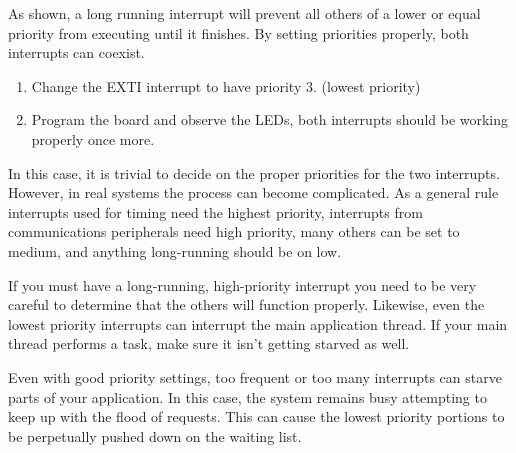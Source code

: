 \documentclass[11pt,fleqn]{book} %
\begin{document}
\begin{exercise}
    As shown, a long running interrupt will prevent all others of a lower or equal priority from executing until it finishes. By setting priorities properly, both interrupts can coexist. 
    
    \begin{enumerate}
        \item Change the EXTI interrupt to have priority 3. (lowest priority)
        \item Program the board and observe the LEDs, both interrupts should be working properly once more.
    \end{enumerate}
    
    In this case, it is trivial to decide on the proper priorities for the two interrupts. However, in real systems the process can become complicated. As a general rule interrupts used for timing need the highest priority, interrupts from communications peripherals need high priority, many others can be set to medium, and anything long-running should be on low. 
    
    If you must have a long-running, high-priority interrupt you need to be very careful to determine that the others will function properly. Likewise, even the lowest priority interrupts can interrupt the main application thread. If your main thread performs a task, make sure it isn't getting starved as well. 
    
    Even with good priority settings, too frequent or too many interrupts can starve parts of your application. In this case, the system remains busy attempting to keep up with the flood of requests. This can cause the lowest priority portions to be perpetually pushed down on the waiting list.
    
\end{exercise}

\end{document}
